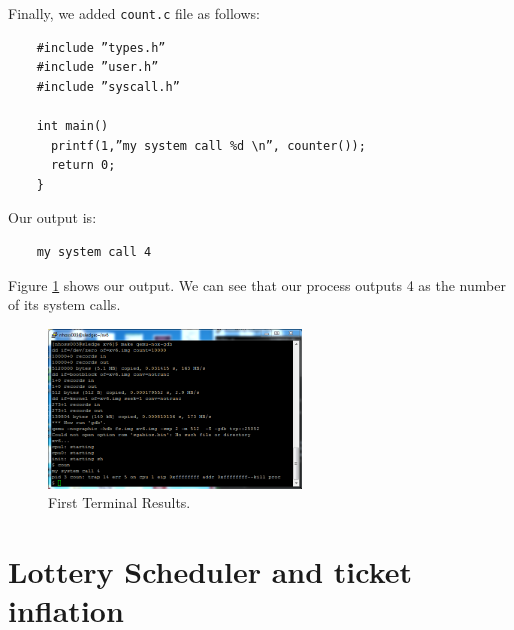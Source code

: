 \documentclass[10pt]{scrartcl}
\begin{document}
Finally, we added \texttt{count.c} file as follows:
 \begin{verbatim}
    #include ”types.h”
    #include ”user.h”
    #include ”syscall.h”
    
    int main()
      printf(1,”my system call %d \n”, counter());
      return 0;
    }
\end{verbatim}

Our output is:

 \begin{verbatim}
    my system call 4
\end{verbatim}


Figure \ref{fig:fig1} shows our output.  We can see that our process outputs 4 as the number of its system calls.

\begin{figure}
  \centering
  \includegraphics[width=0.6\textwidth]{fig1.png}
  \caption{First Terminal Results.}\label{fig:fig1}
\end{figure}

\section{Lottery Scheduler and ticket inflation}
\end{document}
